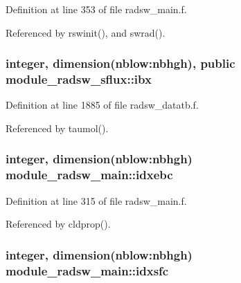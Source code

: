 Definition at line 353 of file radsw\+\_\+main.\+f.



Referenced by rswinit(), and swrad().

\subsubsection[{\texorpdfstring{ibx}{ibx}}]{\setlength{\rightskip}{0pt plus 5cm}integer, dimension(nblow\+:nbhgh), public module\+\_\+radsw\+\_\+sflux\+::ibx}\hypertarget{group__module__radsw__main_gacb1498ecf044449dbe6d7a5630fdc375}{}\label{group__module__radsw__main_gacb1498ecf044449dbe6d7a5630fdc375}


Definition at line 1885 of file radsw\+\_\+datatb.\+f.



Referenced by taumol().

\subsubsection[{\texorpdfstring{idxebc}{idxebc}}]{\setlength{\rightskip}{0pt plus 5cm}integer, dimension(nblow\+:nbhgh) module\+\_\+radsw\+\_\+main\+::idxebc\hspace{0.3cm}{\ttfamily [private]}}\hypertarget{group__module__radsw__main_gaa20102786f7e7f8c71fb2783082eac1b}{}\label{group__module__radsw__main_gaa20102786f7e7f8c71fb2783082eac1b}


Definition at line 315 of file radsw\+\_\+main.\+f.



Referenced by cldprop().

\subsubsection[{\texorpdfstring{idxsfc}{idxsfc}}]{\setlength{\rightskip}{0pt plus 5cm}integer, dimension(nblow\+:nbhgh) module\+\_\+radsw\+\_\+main\+::idxsfc\hspace{0.3cm}{\ttfamily [private]}}\hypertarget{group__module__radsw__main_gad295d723dd7d269cb51c73923a4cbb94}{}\label{group__module__radsw__main_gad295d723dd7d269cb51c73923a4cbb94}


